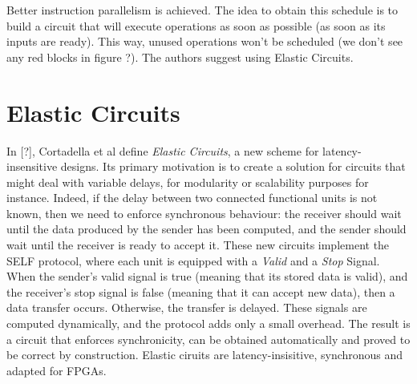 \documentclass{article}
\begin{document}
Better instruction parallelism is achieved. The idea to obtain this schedule is to build a circuit that will execute operations as soon as possible (as soon as its inputs are ready). This way, unused operations won't be scheduled (we don't see any red blocks in figure ?). The authors suggest using Elastic Circuits.

\section{Elastic Circuits}

In [?], Cortadella et al define \textit{Elastic Circuits}, a new scheme for latency-insensitive designs.
Its primary motivation is to create a solution for circuits that might deal with variable delays, for modularity or scalability purposes for instance.
Indeed, if the delay between two connected functional units is not known, then we need to enforce synchronous behaviour: the receiver should wait until the data produced by the sender has been computed, and the sender should wait until the receiver is ready to accept it.
These new circuits implement the SELF protocol, where each unit is equipped with a \textit{Valid} and a \textit{Stop} Signal. When the sender's valid signal is true (meaning that its stored data is valid), and the receiver's stop signal is false (meaning that it can accept new data), then a data transfer occurs. Otherwise, the transfer is delayed. These signals are computed dynamically, and the protocol adds only a small overhead. The result is a circuit that enforces synchronicity, can be obtained automatically and proved to be correct by construction. Elastic ciruits are latency-insisitive, synchronous and adapted for FPGAs.
\end{document}
